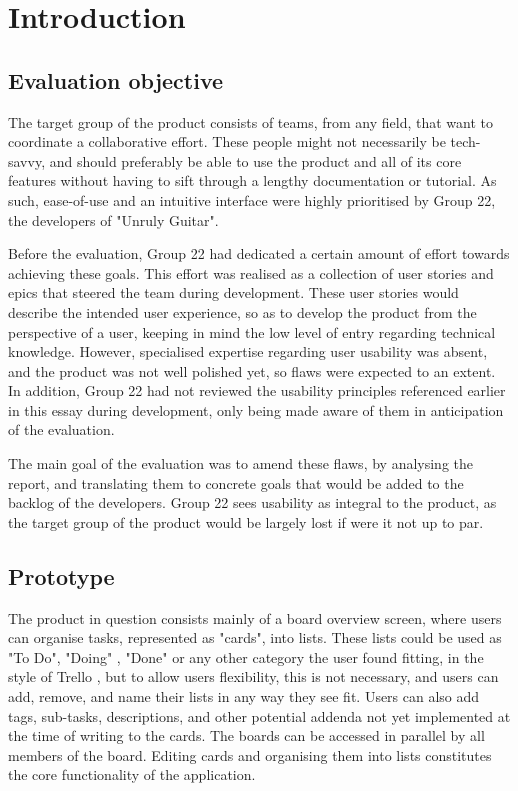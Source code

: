 \section{Introduction}

\subsection{Evaluation objective}
The target group of the product consists of teams, from any field, that want to coordinate a collaborative effort. These people might not necessarily be tech-savvy, and should preferably be able to use the product and all of its core features without having to sift through a lengthy documentation or tutorial. As such, ease-of-use and an intuitive interface were highly prioritised by Group 22, the developers of "Unruly Guitar".

Before the evaluation, Group 22 had dedicated a certain amount of effort towards achieving these goals. This effort was realised as a collection of user stories and epics that steered the team during development. These user stories would describe the intended user experience, so as to develop the product from the perspective of a user, keeping in mind the low level of entry regarding technical knowledge. However, specialised expertise regarding user usability was absent, and the product was not well polished yet, so flaws were expected to an extent. In addition, Group 22 had not reviewed the usability principles referenced earlier in this essay during development, only being made aware of them in anticipation of the evaluation.

The main goal of the evaluation was to amend these flaws, by analysing the report, and translating them to concrete goals that would be added to the backlog of the developers. Group 22 sees usability as integral to the product, as the target group of the product would be largely lost if were it not up to par.
\subsection{Prototype}

The product in question consists mainly of a board overview screen, where users can organise tasks, represented as "cards", into lists. These lists could be used as "To Do", "Doing" , "Done" or any other category the user found fitting, in the style of Trello \cite{Trello}, but to allow users flexibility, this is not necessary, and users can add, remove, and name their lists in any way they see fit. Users can also add tags, sub-tasks, descriptions, and other potential addenda not yet implemented at the time of writing to the cards. The boards can be accessed in parallel by all members of the board. Editing cards and organising them into lists constitutes the core functionality of the application.

